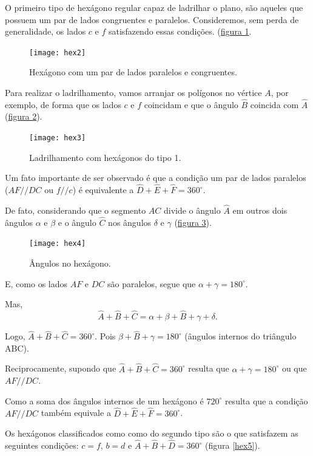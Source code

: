 O primeiro tipo de hexágono regular capaz de ladrilhar o plano, são aqueles que possuem um par de lados congruentes e paralelos. Consideremos, sem perda de generalidade, os lados $c$ e $f$ satisfazendo essas condições.  (\hyperref[hex2]{figura \ref{hex2}}.

\begin{figure}[H]
\centering
\texttt{[image: hex2]}
\caption{Hexágono com um par de lados paralelos e congruentes.}
\label{hex2}
\end{figure}

 
Para realizar o ladrilhamento, vamos arranjar os polígonos no vértice $A$, por exemplo, de forma que os lados $c$ e $f$ coincidam e que o ângulo $\hat{B}$ coincida com $\hat{A}$ (\hyperref[hex3]{figura \ref{hex3}}).

\begin{figure}[H]
\centering
\texttt{[image: hex3]}
\caption{Ladrilhamento com hexágonos do tipo 1.}
\label{hex3}
\end{figure}

Um fato importante de ser observado é que a condição um par de lados paralelos ($AF//DC$ ou $f//c$)  é equivalente a $\hat{D} + \hat{E} + \hat{F} = 360^{\circ}$.

De fato,  considerando que o segmento $AC$ divide o ângulo $\hat{A}$ em outros dois ângulos $\alpha$ e $\beta$ e o ângulo $\hat{C}$ nos ângulos $\delta$ e $\gamma$ (\hyperref[hex4]{figura \ref{hex4}}).


\begin{figure}[H]
\centering
\texttt{[image: hex4]}
\caption{Ângulos no hexágono.}
\label{hex4}
\end{figure}

E, como os lados $AF$ e $DC$ são paralelos, segue que $\alpha +\gamma = 180^{\circ}$.

Mas, $$\hat{A} + \hat{B} + \hat{C} = \alpha + \beta + \hat{B} + \gamma + \delta.$$

Logo, $\hat{A} + \hat{B} + \hat{C} = 360^{\circ}$. Pois  $\beta + \hat{B} + \gamma = 180^{\circ}$ (ângulos internos do triângulo ABC).

Reciprocamente, supondo que $\hat{A} + \hat{B} + \hat{C} = 360^{\circ}$ resulta que  $\alpha +\gamma = 180^{\circ}$ ou que $AF//DC$.

Como a soma dos ângulos internos de um hexágono é $720^{\circ}$ resulta que a condição $AF//DC$ também equivale a $\hat{D} + \hat{E} + \hat{F} = 360^{\circ}$.



Os hexágonos classificados como  como do segundo tipo são o que satisfazem as seguintes condições: $c= f$, $b=d$ e  $\hat{A} + \hat{B} + \hat{D} = 360^{\circ}$ (figura \ref{hex5}).

